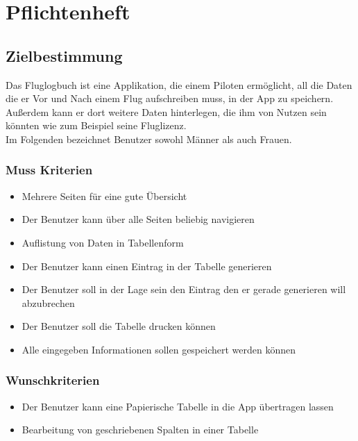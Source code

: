 \documentclass[a4paper]{article} %
\begin{document}
    \section{Pflichtenheft}
    \vspace{1cm}
    \subsection{Zielbestimmung}
    Das Fluglogbuch ist eine Applikation, die einem Piloten ermöglicht, all die Daten die er Vor und Nach einem Flug aufschreiben muss, in der App zu speichern. Außerdem kann er dort weitere Daten hinterlegen, die ihm von Nutzen sein könnten wie zum Beispiel seine Fluglizenz.\\
    Im Folgenden bezeichnet \grqq{}Benutzer\glqq{} sowohl Männer als auch Frauen.\\
    
    \subsubsection{Muss Kriterien}
    \vspace{0.5cm}
    \begin{itemize}
    \item Mehrere Seiten für eine gute Übersicht
    \item Der Benutzer kann über alle Seiten beliebig navigieren
    \item Auflistung von Daten in Tabellenform
    \item Der Benutzer kann einen Eintrag in der Tabelle generieren
    \item Der Benutzer soll in der Lage sein den Eintrag den er gerade generieren will abzubrechen
    \item Der Benutzer soll die Tabelle drucken können
    \item Alle eingegeben Informationen sollen gespeichert werden können
    \end{itemize}

    \subsubsection{Wunschkriterien}
    \vspace{0.5cm}
    \begin{itemize}
    \item Der Benutzer kann eine Papierische Tabelle in die App übertragen lassen
    \item Bearbeitung von geschriebenen Spalten in einer Tabelle
    \end{itemize}
    
\end{document}
